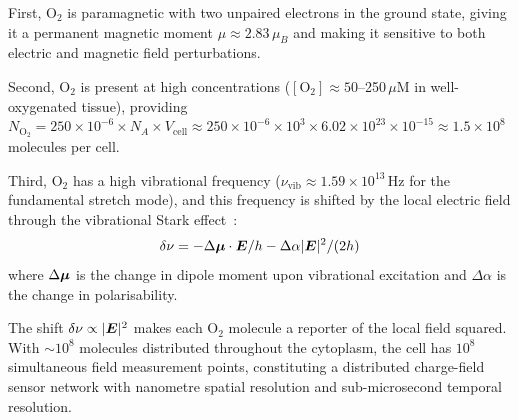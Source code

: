 First, $\mathrm{O}_2$ is paramagnetic with two unpaired electrons in the ground state, giving it a permanent magnetic moment $\mu \approx 2.83\,\mu_B$ and making it sensitive to both electric and magnetic field perturbations.

Second, $\mathrm{O}_2$ is present at high concentrations ($[\mathrm{O}_2] \approx 50$--250\,$\mu$M in well-oxygenated tissue), providing $N_{\mathrm{O}_2} = 250 \times 10^{-6} \times N_A \times V_{\mathrm{cell}} \approx 250 \times 10^{-6} \times 10^3 \times 6.02 \times 10^{23} \times 10^{-15} \approx 1.5 \times 10^8$ molecules per cell.

Third, $\mathrm{O}_2$ has a high vibrational frequency ($\nu_{\mathrm{vib}} \approx 1.59 \times 10^{13}$\,Hz for the fundamental stretch mode), and this frequency is shifted by the local electric field through the vibrational Stark effect~\cite{Oklejas2002,Boxer2009}:
\begin{equation}
  \delta\nu = -\Delta\boldsymbol{\mu} \cdot \boldsymbol{E} / h - \Delta\alpha |\boldsymbol{E}|^2 / (2h)
  \label{v:eq:stark_effect}
\end{equation}
where $\Delta\boldsymbol{\mu}$ is the change in dipole moment upon vibrational excitation and $\Delta\alpha$ is the change in polarisability.

The shift $\delta\nu \propto |\boldsymbol{E}|^2$ makes each $\mathrm{O}_2$ molecule a reporter of the local field squared. With $\sim\!10^8$ molecules distributed throughout the cytoplasm, the cell has $10^8$ simultaneous field measurement points, constituting a distributed charge-field sensor network with nanometre spatial resolution and sub-microsecond temporal resolution.

